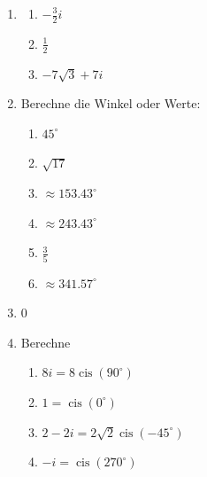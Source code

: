 \begin{enumerate}
    \item  \begin{enumerate}
            \item $-\frac{3}{2}i$
            \item $\frac{1}{2}$
            \item $-7\sqrt{3}+7i$
         \end{enumerate}
    \item Berechne die Winkel oder Werte:
    \begin{enumerate}
        \item $45^\circ$
        \item $\sqrt{17}$
        \item $\approx 153.43^\circ$
        \item $\approx 243.43^\circ$
        \item $\frac{3}{5}$
        \item $\approx 341.57^\circ$
    \end{enumerate}
    \item $0$
    \item Berechne
    \begin{enumerate}
        \item $8i = 8 \operatorname{cis}(90^\circ)$
        \item $1 = \operatorname{cis}(0^\circ)$
        \item $2 - 2i = 2\sqrt{2} \operatorname{cis}(-45^\circ)$
        \item $-i = \operatorname{cis}(270^\circ)$
    \end{enumerate}



\end{enumerate}

